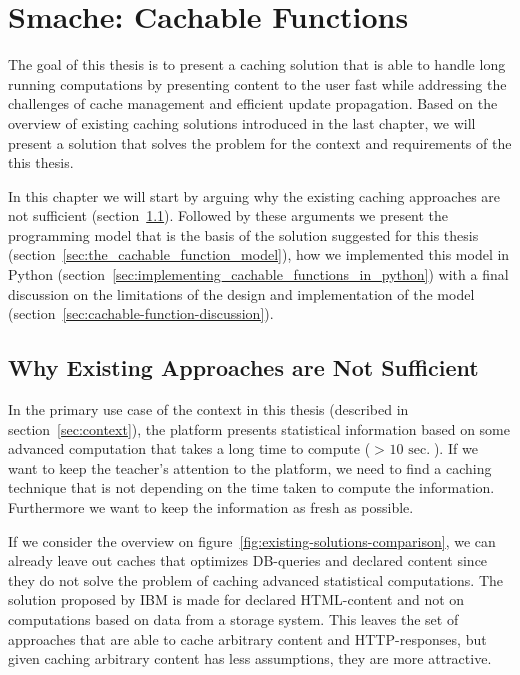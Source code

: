 \chapter{Smache: Cachable Functions}
\label{chapter:smache-cachable-functions}

The goal of this thesis is to present a caching solution that is able to handle long running computations by presenting content to the user fast while addressing the challenges of cache management and efficient update propagation. Based on the overview of existing caching solutions introduced in the last chapter, we will present a solution that solves the problem for the context and requirements of the this thesis.

In this chapter we will start by arguing why the existing caching approaches are not sufficient (section~\ref{sec:existing-approaches-are-not-sufficient}). Followed by these arguments we present the programming model that is the basis of the solution suggested for this thesis (section~\ref{sec:the_cachable_function_model}), how we implemented this model in Python (section~\ref{sec:implementing_cachable_functions_in_python}) with a final discussion on the limitations of the design and implementation of the model (section~\ref{sec:cachable-function-discussion}).

\section{Why Existing Approaches are Not Sufficient}
\label{sec:existing-approaches-are-not-sufficient}

In the primary use case of the context in this thesis (described in section~\ref{sec:context}), the platform presents statistical information based on some advanced computation that takes a long time to compute ($>\text{ 10 sec.}$). If we want to keep the teacher's attention to the platform, we need to find a caching technique that is not depending on the time taken to compute the information. Furthermore we want to keep the information as fresh as possible.

If we consider the overview on figure~\ref{fig:existing-solutions-comparison}, we can already leave out caches that optimizes DB-queries and declared content since they do not solve the problem of caching advanced statistical computations. The solution proposed by IBM is made for declared HTML-content and not on computations based on data from a storage system. This leaves the set of approaches that are able to cache arbitrary content and HTTP-responses, but given caching arbitrary content has less assumptions, they are more attractive.

